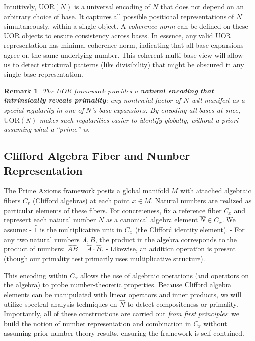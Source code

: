 \documentclass[11pt]{article}
\newtheorem{remark}{Remark}
\begin{document}
Intuitively, $\mathrm{UOR}(N)$ is a universal encoding of $N$ that does not depend on an arbitrary choice of base. It captures all possible positional representations of $N$ simultaneously, within a single object. A \emph{coherence norm} can be defined on these UOR objects to ensure consistency across bases. In essence, any valid UOR representation has minimal coherence norm, indicating that all base expansions agree on the same underlying number. This coherent multi-base view will allow us to detect structural patterns (like divisibility) that might be obscured in any single-base representation.

\begin{remark}
The UOR framework provides a \textbf{natural encoding that intrinsically reveals primality}: any nontrivial factor of $N$ will manifest as a special regularity in one of $N$'s base expansions. By encoding all bases at once, $\mathrm{UOR}(N)$ makes such regularities easier to identify globally, without a priori assuming what a “prime” is.
\end{remark}

\subsection{Clifford Algebra Fiber and Number Representation}
The Prime Axioms framework posits a global manifold $M$ with attached algebraic fibers $C_x$ (Clifford algebras) at each point $x\in M$. Natural numbers are realized as particular elements of these fibers. For concreteness, fix a reference fiber $C_x$ and represent each natural number $N$ as a canonical algebra element $\hat{N}\in C_x$. We assume:
- $\hat{1}$ is the multiplicative unit in $C_x$ (the Clifford identity element).
- For any two natural numbers $A,B$, the product in the algebra corresponds to the product of numbers: $\widehat{AB} = \hat{A}\cdot \hat{B}$.
- Likewise, an addition operation is present (though our primality test primarily uses multiplicative structure).

This encoding within $C_x$ allows the use of algebraic operations (and operators on the algebra) to probe number-theoretic properties. Because Clifford algebra elements can be manipulated with linear operators and inner products, we will utilize spectral analysis techniques on $\hat{N}$ to detect compositeness or primality. Importantly, all of these constructions are carried out \emph{from first principles}: we build the notion of number representation and combination in $C_x$ without assuming prior number theory results, ensuring the framework is self-contained.
\end{document}
